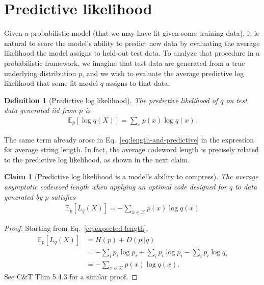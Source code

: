 \documentclass{article}
\newtheorem{claim}{Claim}
\newtheorem{mydef}{Definition}
\newcommand{\E}{\mathbb{E}}
\begin{document}
    \section{Predictive likelihood}%
    \label{sec:predictive-likelihood}
    Given a probabilistic model (that we may have fit given some training
    data), it is natural to score the model's ability to predict new data by
    evaluating the average likelihood the model assigns to held-out test data.
    To analyze that procedure in a probabilistic framework, we imagine that test
    data are generated from a true underlying distribution $p$, and we wish to
    evaluate the average predictive log likelihood that some fit model $q$ assigns
    to that data.

    \begin{mydef}[Predictive log likelihood]
        The predictive likelihood of $q$ on test data generated iid from $p$ is
        \begin{align}
            \E_p [ \log q(X) ] = \sum_x p(x) \log q(x).
        \end{align}
    \end{mydef}

    The same term already arose in Eq.~\eqref{eq:length-and-predictive} in the
    expression for average string length. In fact, the average codeword length
    is precisely related to the predictive log likelihood, as shown in the next claim.

    \begin{claim}[Predictive log likelihood is a model's ability to compress]
        The average asymptotic codeword length when applying an optimal code
        designed for $q$ to data generated by $p$ satisfies
        \begin{align}
            \E_p [L_q(X)] = - \sum_{x \in \mathcal{X}} p(x) \log q(x)
        \end{align}
    \end{claim}
    \begin{proof}
        Starting from Eq.~\eqref{eq:expected-length},
        \begin{align}
            \E_p [ L_q(X) ] &= H(p) + D(p||q) \\
            &= - \sum_i p_i \log p_i + \sum_i p_i \log p_i - \sum_i p_i \log q_i \\
            &= - \sum_{x \in \mathcal{X}} p(x) \log q(x).
        \end{align}
        See C\&T Thm 5.4.3 for a similar proof.
    \end{proof}
\end{document}
